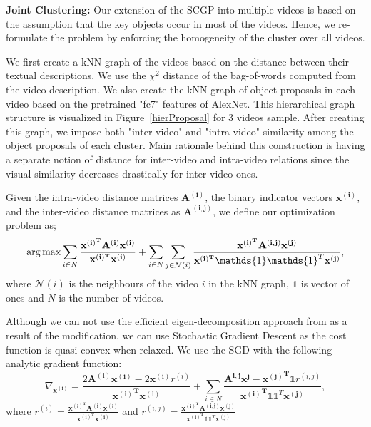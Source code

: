 \noindent\textbf{Joint Clustering:} Our extension of the SCGP into multiple videos is based on the assumption that the key objects occur in most of the videos. Hence, we re-formulate the problem by enforcing the homogeneity of the cluster over all videos.

We first create a kNN graph of the videos based on the distance between their textual descriptions. We use the $\chi^2$ distance of the bag-of-words computed from the video description. We also create the kNN graph of object proposals in each video based on the pretrained "fc7" features of AlexNet\cite{alexnet}. This hierarchical graph structure is visualized in Figure~\ref{hierProposal} for 3 videos sample. After creating this graph, we impose both "inter-video" and "intra-video" similarity among the object proposals of each cluster. Main rationale behind this construction is having a separate notion of distance for inter-video and intra-video relations since the visual similarity decreases drastically for inter-video ones.

Given the intra-video distance matrices $\mathbf{A^{(i)}}$, the binary indicator vectors $\mathbf{x^{(i)}}$, and the inter-video distance matrices as $\mathbf{A^{(i,j)}}$, we define our optimization problem as;
\begin{equation}
\argmax \sum_{i \in N} \frac{\mathbf{x^{(i)^T}}\mathbf{A^{(i)}}\mathbf{x^{(i)}}}{\mathbf{x^{(i)^T}}\mathbf{x^{(i)}}} +
\sum_{i \in N} \sum_{j \in \mathcal{N}(i)} \frac{\mathbf{x^{(i)^T}}\mathbf{A^{(i,j)}}\mathbf{x^{(j)}}} {\mathbf{x^{(i)^T}}\mathds{1}\mathds{1}^T\mathbf{x^{(j)}}},
\end{equation}
where $\mathcal{N}(i)$ is the neighbours of the video $i$ in the kNN graph, $\mathds{1}$ is vector of ones and $N$ is the number of videos.

Although we can not use the efficient eigen-decomposition approach from \cite{scgp,scgp_eigen} as a result of the modification, we can use Stochastic Gradient Descent as the cost function is quasi-convex when relaxed. We use the SGD with the following analytic gradient function:
\begin{equation}
  \nabla_{\mathbf{x^{(i)}}} = \frac{2\mathbf{A^{(i)}} \mathbf{x^{(i)}} -2\mathbf{x^{(i)}} r^{(i)}}
  {\mathbf{{x^{(i)}}^T}\mathbf{x^{(i)}}}
+ \sum_{i \in N} \frac{\mathbf{A^{i,j}}\mathbf{x^{j}} - \mathbf{{x^{(j)}}^T} \mathds{1} r^{(i,j)}}{\mathbf{{x^{(i)}}^T} \mathds{1} \mathds{1}^T \mathbf{x^{(j)}} },
\end{equation}
where $r^{(i)}=\frac{\mathbf{x^{(i)^T}}\mathbf{A^{(i)}}\mathbf{x^{(i)}}}{\mathbf{x^{(i)^T}}\mathbf{x^{(i)}}}$ and $r^{(i,j)}=\frac{\mathbf{x^{(i)^T}}\mathbf{A^{(i,j)}}\mathbf{x^{(j)}}} {\mathbf{x^{(i)^T}}\mathds{1}\mathds{1}^T\mathbf{x^{(j)}}}$

